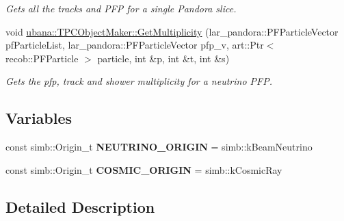 \begin{DoxyCompactItemize}
\begin{DoxyCompactList}\small\item\em Gets all the tracks and P\-F\-P for a single Pandora slice. \end{DoxyCompactList}\item 
void \hyperlink{group__UBXSec_gaedb13816ca0eb0d775755a93c593443e}{ubana\-::\-T\-P\-C\-Object\-Maker\-::\-Get\-Multiplicity} (lar\-\_\-pandora\-::\-P\-F\-Particle\-Vector pf\-Particle\-List, lar\-\_\-pandora\-::\-P\-F\-Particle\-Vector pfp\-\_\-v, art\-::\-Ptr$<$ recob\-::\-P\-F\-Particle $>$ particle, int \&p, int \&t, int \&s)
\begin{DoxyCompactList}\small\item\em Gets the pfp, track and shower multiplicity for a neutrino P\-F\-P. \end{DoxyCompactList}\end{DoxyCompactItemize}
\subsection*{Variables}
\begin{DoxyCompactItemize}
\item 
\hypertarget{group__UBXSec_ga8c1cb2271faf4557586c53e3f096f35a}{const simb\-::\-Origin\-\_\-t {\bfseries N\-E\-U\-T\-R\-I\-N\-O\-\_\-\-O\-R\-I\-G\-I\-N} = simb\-::k\-Beam\-Neutrino}\label{group__UBXSec_ga8c1cb2271faf4557586c53e3f096f35a}

\item 
\hypertarget{group__UBXSec_gad9e94c0c3656e123f9ff20869847b357}{const simb\-::\-Origin\-\_\-t {\bfseries C\-O\-S\-M\-I\-C\-\_\-\-O\-R\-I\-G\-I\-N} = simb\-::k\-Cosmic\-Ray}\label{group__UBXSec_gad9e94c0c3656e123f9ff20869847b357}

\end{DoxyCompactItemize}


\subsection{Detailed Description}


